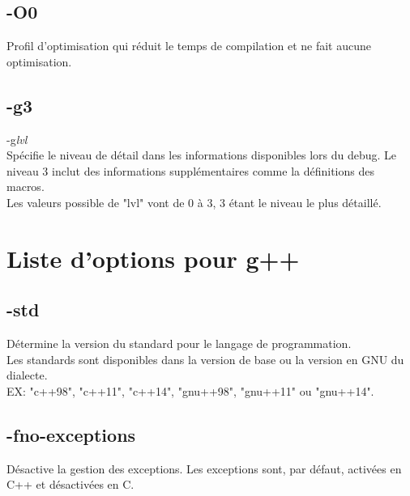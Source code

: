 \documentclass[headings=appendixprefix]{scrreprt}
\begin{document}
\section{-O0}

Profil d'optimisation qui réduit le temps de compilation et ne fait aucune optimisation.\\


\section{-g3}

-g\textit{lvl}\\
Spécifie le niveau de détail dans les informations disponibles lors du debug. Le niveau 3 inclut des informations supplémentaires comme la définitions des macros.\\

Les valeurs possible de "lvl" vont de 0 à 3, 3 étant le niveau le plus détaillé.\\


\chapter{Liste d'options pour g++}
\setcounter{secnumdepth}{0}


\section{-std}

Détermine la version du standard pour le langage de programmation.\\

Les standards sont disponibles dans la version de base ou la version en GNU du dialecte.\\
EX: "c++98", "c++11", "c++14", "gnu++98", "gnu++11" ou "gnu++14".\\


\section{-fno-exceptions}

Désactive la gestion des exceptions. Les exceptions sont, par défaut, activées en C++ et désactivées en C.\\
\end{document}
